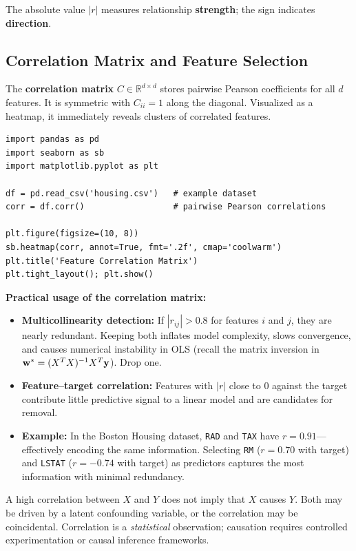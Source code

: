 The absolute value $|r|$ measures relationship \textbf{strength}; the sign indicates \textbf{direction}.

\subsection*{Correlation Matrix and Feature Selection}

The \textbf{correlation matrix} $C \in \mathbb{R}^{d \times d}$ stores pairwise Pearson coefficients for all $d$ features. It is symmetric with $C_{ii} = 1$ along the diagonal. Visualized as a heatmap, it immediately reveals clusters of correlated features.

\begin{lstlisting}[style=pythonstyle]
import pandas as pd
import seaborn as sb
import matplotlib.pyplot as plt

df = pd.read_csv('housing.csv')   # example dataset
corr = df.corr()                  # pairwise Pearson correlations

plt.figure(figsize=(10, 8))
sb.heatmap(corr, annot=True, fmt='.2f', cmap='coolwarm')
plt.title('Feature Correlation Matrix')
plt.tight_layout(); plt.show()
\end{lstlisting}

\textbf{Practical usage of the correlation matrix:}

\begin{itemize}
    \item \textbf{Multicollinearity detection:} If $|r_{ij}| > 0.8$ for features $i$ and $j$, they are nearly redundant. Keeping both inflates model complexity, slows convergence, and causes numerical instability in OLS (recall the matrix inversion in $\mathbf{w}^* = (X^TX)^{-1}X^T\mathbf{y}$). Drop one.
    \item \textbf{Feature--target correlation:} Features with $|r|$ close to $0$ against the target contribute little predictive signal to a linear model and are candidates for removal.
    \item \textbf{Example:} In the Boston Housing dataset, \texttt{RAD} and \texttt{TAX} have $r = 0.91$---effectively encoding the same information. Selecting \texttt{RM} ($r = 0.70$ with target) and \texttt{LSTAT} ($r = -0.74$ with target) as predictors captures the most information with minimal redundancy.
\end{itemize}

\begin{remark}
A high correlation between $X$ and $Y$ does not imply that $X$ causes $Y$. Both may be driven by a latent confounding variable, or the correlation may be coincidental. Correlation is a \emph{statistical} observation; causation requires controlled experimentation or causal inference frameworks.
\end{remark}

